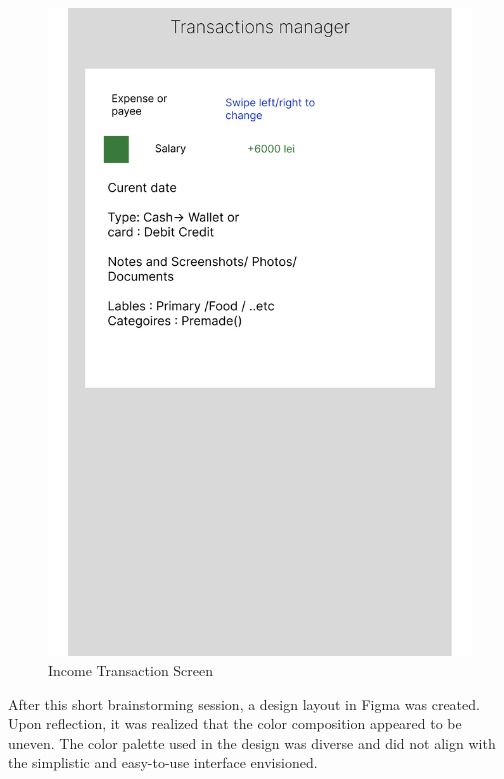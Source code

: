 \begin{figure}[htbp]
\begin{minipage}[b]{0.32\textwidth}
    \includegraphics[width=\textwidth]{Graphics/Design/TM_I.png}
    \caption{Income Transaction Screen}
    \label{fig:image3}
  \end{minipage}
\end{figure}



After this short brainstorming session, a design layout in Figma was created. Upon reflection, it was realized that the color composition appeared to be uneven. The color palette used in the design was diverse and did not align with the simplistic and easy-to-use interface envisioned.


